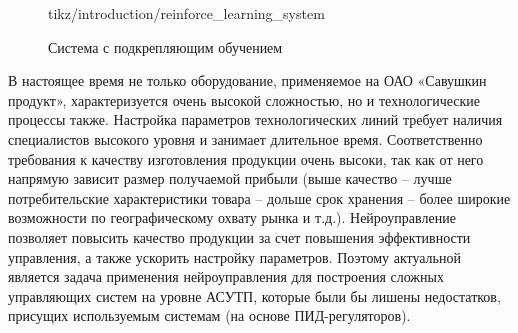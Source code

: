\begin{figure}[H]
    \centering
    
        {tikz/introduction/reinforce_learning_system}
    \caption{Система с подкрепляющим обучением}
    \label{fig:reinforce_learning_system}
\end{figure}

В настоящее время не только оборудование, применяемое на ОАО «Савушкин продукт», характеризуется очень высокой сложностью, но и технологические процессы также. Настройка параметров технологических линий требует наличия специалистов высокого уровня и занимает длительное время. Соответственно требования к качеству изготовления продукции очень высоки, так как от него напрямую зависит размер получаемой прибыли (выше качество – лучше потребительские характеристики товара – дольше срок хранения – более широкие возможности по географическому охвату рынка и т.д.). Нейроуправление позволяет повысить качество продукции за счет повышения эффективности управления, а также ускорить настройку параметров. Поэтому актуальной является задача применения нейроуправления для построения сложных управляющих систем на уровне АСУТП, которые были бы лишены недостатков, присущих используемым системам (на основе ПИД-регуляторов).
